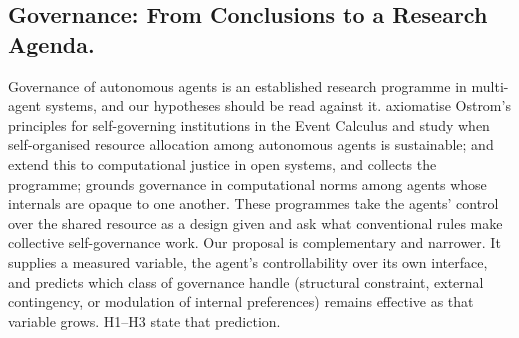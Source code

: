 \documentclass[letterpaper]{article} %
\theoremstyle{definition}
\begin{document}
\subsection{Governance: From Conclusions to a Research Agenda.}

Governance of autonomous agents is an established research programme in multi-agent systems, and our hypotheses should be read against it. \citet{pittAxiomatizationSocioEconomic2012} axiomatise Ostrom's principles for self-governing institutions in the Event Calculus and study when self-organised resource allocation among autonomous agents is sustainable; \citet{pittComputationalJustice2015} and \citet{pittOpenAgentSociety2015} extend this to computational justice in open systems, and \citet{pittSelfOrganisingMAS2021} collects the programme; \citet{singhNormsGoverning2013} grounds governance in computational norms among agents whose internals are opaque to one another. These programmes take the agents' control over the shared resource as a design given and ask what conventional rules make collective self-governance work. Our proposal is complementary and narrower. It supplies a measured variable, the agent's controllability over its own interface, and predicts which class of governance handle (structural constraint, external contingency, or modulation of internal preferences) remains effective as that variable grows. H1--H3 state that prediction.
\end{document}
